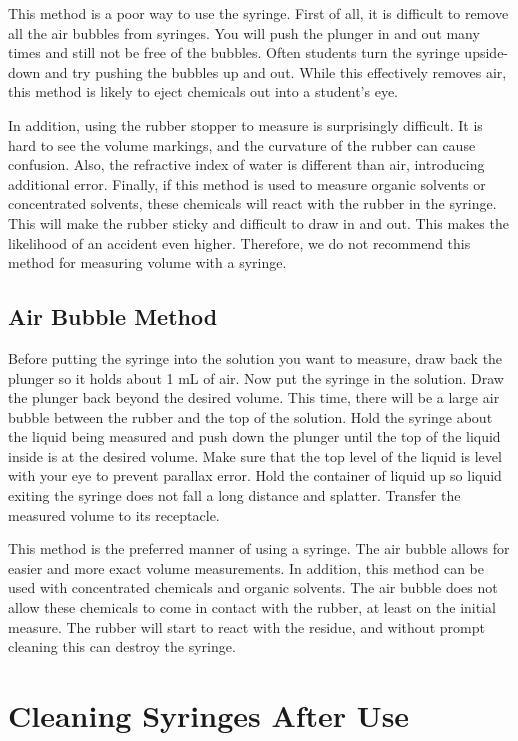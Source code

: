 This method is a poor way to use the syringe. First of all, it is difficult to remove all the air bubbles from syringes. You will push the plunger in and out many times and still not be free of the bubbles. Often students turn the syringe upside-down and try pushing the bubbles up and out. While this effectively removes air, this method is likely to eject chemicals out into a student’s eye. 

In addition, using the rubber stopper to measure is surprisingly difficult. It is hard to see the volume markings, and the curvature of the rubber can cause confusion. Also, the refractive index of water is different than air, introducing additional error. Finally, if this method is used to measure organic solvents or concentrated solvents, these chemicals will react with the rubber in the syringe. This will make the rubber sticky and difficult to draw in and out. This makes the likelihood of an accident even higher. Therefore, we do not recommend this method for measuring volume with a syringe.

\subsection{Air Bubble Method}
Before putting the syringe into the solution you want to measure, draw back the plunger so it holds about 1 mL of air. Now put the syringe in the solution. Draw the plunger back beyond the desired volume. This time, there will be a large air bubble between the rubber and the top of the solution. Hold the syringe about the liquid being measured and push down the plunger until the top of the liquid inside is at the desired volume. Make sure that the top level of the liquid is level with your eye to prevent parallax error. Hold the container of liquid up so liquid exiting the syringe does not fall a long distance and splatter. Transfer the measured volume to its receptacle. 

This method is the preferred manner of using a syringe. The air bubble allows for easier and more exact volume measurements. In addition, this method can be used with concentrated chemicals and organic solvents. The air bubble does not allow these chemicals to come in contact with the rubber, at least on the initial measure. The rubber will start to react with the residue, and without prompt cleaning this can destroy the syringe.
 
\section{Cleaning Syringes After Use}


